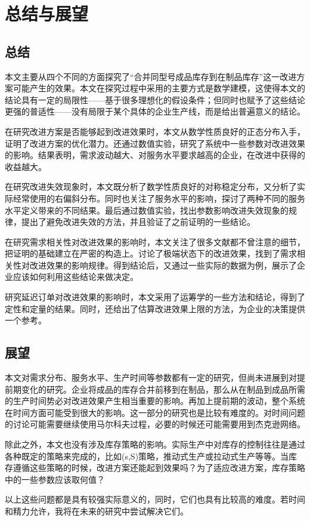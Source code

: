 \chapter{总结与展望}





\section{总结}

本文主要从四个不同的方面探究了“合并同型号成品库存到在制品库存”这一改进方案可能产生的效果。本文在探究过程中采用的主要方式是数学建模，这使得本文的结论具有一定的局限性——基于很多理想化的假设条件；但同时也赋予了这些结论更强的普适性——没有局限于某个具体的企业生产线，而是给出普遍意义的结论。

在研究改进方案是否能够起到改进效果时，本文从数学性质良好的正态分布入手，证明了改进方案的优化潜力。还通过数值实验，研究了系统中一些参数对改进效果的影响。结果表明，需求波动越大、对服务水平要求越高的企业，在改进中获得的收益越大。

在研究改进失效现象时，本文既分析了数学性质良好的对称稳定分布，又分析了实际经常使用的右偏斜分布。同时也关注了服务水平的影响，探讨了两种不同的服务水平定义带来的不同结果。最后通过数值实验，找出参数影响改进失效现象的规律，提出了避免改进失效的方法，并且验证了之前证明的一些结论。

在研究需求相关性对改进效果的影响时，本文关注了很多文献都不曾注意的细节，把证明的基础建立在严密的构造上。讨论了极端状态下的改进效果，找到了需求相关性对改进效果的影响规律。得到结论后，又通过一些实际的数据为例，展示了企业应该如何利用这些结论来做决定。

研究延迟订单对改进效果的影响时，本文采用了运筹学的一些方法和结论，得到了定性和定量的结果。同时，还给出了估算改进效果上限的方法，为企业的决策提供一个参考。







\section{展望}

本文对需求分布、服务水平、生产时间等参数都有一定的研究，但尚未进展到对提前期变化的研究。企业将成品的库存合并前移到在制品，那么从在制品到成品所需的生产时间势必对改进效果产生相当重要的影响。再加上提前期的波动，整个系统在时间方面可能受到很大的影响。这一部分的研究也是比较有难度的。对时间问题的讨论可能需要继续使用马尔科夫过程，必要的时候还可能需要用到杰克逊网络。

除此之外，本文也没有涉及库存策略的影响。实际生产中对库存的控制往往是通过各种既定的策略来完成的，比如(s,S)策略，推动式生产或拉动式生产等等。当库存遵循这些策略的时候，改进方案还能起到效果吗？为了适应改进方案，库存策略中的一些参数应该取何值？

以上这些问题都是具有较强实际意义的，同时，它们也具有比较高的难度。若时间和精力允许，我将在未来的研究中尝试解决它们。





























